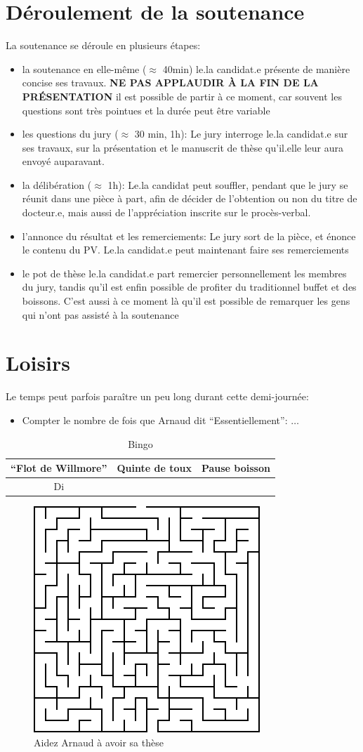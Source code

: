 \documentclass[a4paper]{leaflet}
\begin{document}
\section*{Déroulement de la soutenance}
La soutenance se déroule en plusieurs étapes:
\begin{itemize}
\item la soutenance en elle-même ($\approx$ 40min)
  le.la candidat.e présente de manière concise ses travaux.
  \textbf{NE PAS APPLAUDIR À LA FIN DE LA PRÉSENTATION}
  il est possible de partir à ce moment, car souvent les questions sont très pointues et la durée peut être variable
\item les questions du jury ($\approx$ 30 min, 1h):
  Le jury interroge le.la candidat.e sur ses travaux, sur la présentation et le manuscrit de thèse qu'il.elle leur aura envoyé auparavant.
\item la délibération ($\approx$ 1h):
  Le.la candidat peut souffler, pendant que le jury se réunit dans une pièce à part, afin de décider de l'obtention ou non du titre de docteur.e, mais aussi de l'appréciation inscrite sur le procès-verbal.
\item l'annonce du résultat et les remerciements:
  Le jury sort de la pièce, et énonce le contenu du PV. Le.la candidat.e peut maintenant faire ses remerciements
\item le pot de thèse
  le.la candidat.e part remercier personnellement les membres du jury, tandis qu'il est enfin possible de profiter du traditionnel buffet et des boissons. C'est aussi à ce moment là qu'il est possible de remarquer les gens qui n'ont pas assisté à la soutenance
\end{itemize}
\section*{Loisirs}
Le temps peut parfois paraître un peu long durant cette demi-journée:

\begin{itemize}
\item Compter le nombre de fois que Arnaud dit ``Essentiellement'': $\dots$
\end{itemize}

\begin{table}[!h]
  \centering
  \begin{tabular}{*3{|c}}
    ``Flot de Willmore'' & Quinte de toux & Pause boisson  \\ \hline
    Di
  \end{tabular}
  \caption{Bingo}
\end{table}

\begin{figure}
  \caption{Aidez Arnaud à avoir sa thèse}
\includegraphics{maz.png}
\end{figure}
\end{document}
